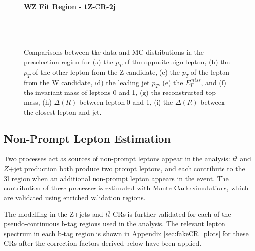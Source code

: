 \begin{figure}[H] 
    \textbf{WZ Fit Region - tZ-CR-2j}\\
    \\
    \\
    \\
    \caption{Comparisons between the data and MC distributions in the preselection region for (a) the $p_T$ of the opposite sign lepton, (b) the $p_T$ of the other lepton from the Z candidate, (c) the $p_T$ of the lepton from the W candidate, (d) the leading jet $p_T$, (e) the $E_T^{miss}$, and (f) the invariant mass of leptons 0 and 1, (g) the reconstructed top mass, (h) $\Delta(R)$ between lepton 0 and 1, (i) the $\Delta(R)$ between the closest lepton and jet.}
    \label{kin:tZ_CR_2j}
\end{figure}

\subsection{Non-Prompt Lepton Estimation}
\label{sec:fakes}

Two processes act as sources of non-prompt leptons appear in the analysis: $t\bar{t}$ and $Z$+jet production both produce two prompt leptons, and each contribute to the 3l region when an additional non-prompt lepton appears in the event. The contribution of these processes is estimated with Monte Carlo simulations, which are validated using enriched validation regions.

The modelling in the Z+jets and $t\bar{t}$ CRs is further validated for each of the pseudo-continuous b-tag regions used in the analysis. The relevant lepton \pt spectrum in each b-tag region is shown in Appendix \ref{sec:fakeCR_plots} for these CRs  after the correction factors derived below have been applied.

